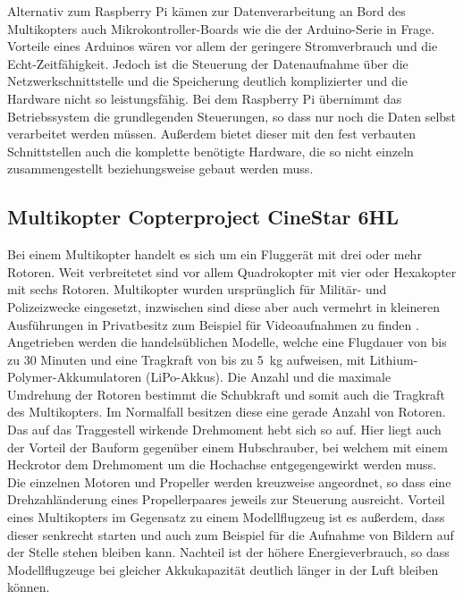 \documentclass[a4paper,12pt,bibliography=totoc, listof=totoc,titlepage,pointlessnumbers]{scrreprt}
\begin{document}
Alternativ zum Raspberry Pi kämen zur Datenverarbeitung an Bord des Multikopters auch Mikrokontroller-Boards wie die der Arduino-Serie in Frage. Vorteile eines Arduinos wären vor allem der geringere Stromverbrauch und die Echt-Zeitfähigkeit. Jedoch ist die Steuerung der Datenaufnahme über die Netzwerkschnittstelle und die Speicherung deutlich komplizierter und die Hardware nicht so leistungsfähig. Bei dem Rasp\-berry Pi übernimmt das Betriebssystem die grundlegenden Steuerungen, so dass nur noch die Daten selbst verarbeitet werden müssen. Außerdem bietet dieser mit den fest verbauten Schnittstellen auch die komplette benötigte Hardware, die so nicht einzeln zusammengestellt beziehungsweise gebaut werden muss.


\subsection{Multikopter Copterproject CineStar 6HL}
Bei einem Multikopter handelt es sich um ein Fluggerät mit drei oder mehr Rotoren. Weit verbreitetet sind vor allem Quadrokopter mit vier oder Hexakopter mit sechs Rotoren. Multikopter wurden ursprünglich für Militär- und Polizeizwecke eingesetzt, inzwischen sind diese aber auch vermehrt in kleineren Ausführungen in Privatbesitz zum Beispiel für Videoaufnahmen zu finden \citep{Quadro}. Angetrieben werden die handelsüblichen Modelle, welche eine Flugdauer von bis zu 30 Minuten und eine Tragkraft von bis zu 5~kg aufweisen, mit Lithium-Polymer-Akkumulatoren (LiPo-Akkus). Die Anzahl und die maximale Umdrehung der Rotoren bestimmt die Schubkraft und somit auch die Tragkraft des Multikopters. Im Normalfall besitzen diese eine gerade Anzahl von Rotoren. Das auf das Traggestell wirkende Drehmoment hebt sich so auf. Hier liegt auch der Vorteil der Bauform gegenüber einem Hubschrauber, bei welchem mit einem Heckrotor dem Drehmoment um die Hochachse entgegengewirkt werden muss. Die einzelnen Motoren und Propeller werden kreuzweise angeordnet, so dass eine Drehzahländerung eines Propellerpaares jeweils zur Steuerung ausreicht. Vorteil eines Multikopters im Gegensatz zu einem Modellflugzeug ist es außerdem, dass dieser senkrecht starten und auch zum Beispiel für die Aufnahme von Bildern auf der Stelle stehen bleiben kann. Nachteil ist der höhere Energieverbrauch, so dass Modellflugzeuge bei gleicher Akkukapazität deutlich länger in der Luft bleiben können. \citep{Bachfeld}
\end{document}
